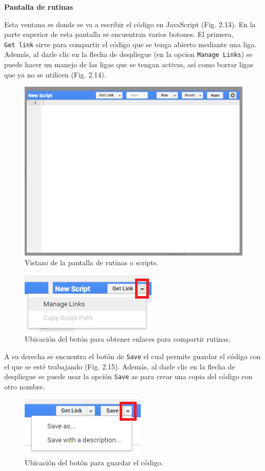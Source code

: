 \documentclass[
  12pt,
  letterpaper,
  twoside]{book}
\begin{document}
\textbf{Pantalla de rutinas}

Esta ventana es donde se va a escribir el código en JavaScript (Fig. 2.13). En la parte superior de esta pantalla se encuentran varios botones. El primero, \texttt{Get\ link} sirve para compartir el código que se tenga abierto mediante una liga. Además, al darle clic en la flecha de despliegue (en la opcion \texttt{Manage\ Links}) se puede hacer un manejo de las ligas que se tengan activas, así como borrar ligas que ya no se utilicen (Fig. 2.14).

\begin{figure}[btp]

{\centering \includegraphics[width=0.5\linewidth]{Img/editor} 

}

\caption{Vistazo de la pantalla de rutinas o scripts.}\label{fig:unnamed-chunk-14}
\end{figure}

\begin{figure}[btp]

{\centering \includegraphics[width=0.3\linewidth]{Img/links} 

}

\caption{Ubicación del botón para obtener enlaces para compartir rutinas.}\label{fig:unnamed-chunk-15}
\end{figure}

A su derecha se encuentra el botón de \texttt{Save} el cual permite guardar el código con el que se esté trabajando (Fig. 2.15). Además, al darle clic en la flecha de despliegue se puede usar la opción \texttt{Save} as para crear una copia del código con otro nombre.

\begin{figure}[btp]

{\centering \includegraphics[width=0.3\linewidth]{Img/save} 

}

\caption{Ubicación del botón para guardar el código.}\label{fig:unnamed-chunk-16}
\end{figure}
\end{document}
